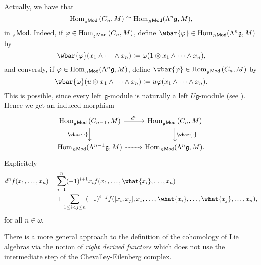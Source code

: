 \begin{remark}
	Actually, we have that 
	\begin{equation*}
		\Hom_{_{\mathfrak{g}}\mathsf{Mod}}\del[0]{C_n,M} \cong \Hom_{_{R}\mathsf{Mod}}(\Lambda^n \mathfrak{g},M),
	\end{equation*}
	\noindent in $_{\mathbb{Z}}\mathsf{Mod}$. Indeed, if $\varphi \in \Hom_{_{\mathfrak{g}}\mathsf{Mod}}\del[0]{C_n,M}$, define $\wbar{\varphi} \in \Hom_{_{R}\mathsf{Mod}}(\Lambda^n \mathfrak{g},M)$ by 
	\begin{equation*}
		\wbar{\varphi}(x_1 \wedge \dots \wedge x_n) := \varphi(1 \otimes x_1 \wedge \dots \wedge x_n),
	\end{equation*}
	\noindent and conversly, if $\varphi \in \operatorname{Hom}_{_{R}\mathsf{Mod}}(\Lambda^n \mathfrak{g},M)$, define $\wbar{\varphi} \in \Hom_{_{\mathfrak{g}}\mathsf{Mod}}\del[0]{C_n,M}$ by
	\begin{equation*}
		\wbar{\varphi}(u \otimes x_1 \wedge \dots \wedge x_n) := u \varphi(x_1 \wedge \dots \wedge x_n).
	\end{equation*}
	\noindent This is possible, since every left $\mathfrak{g}$-module is naturally a left $U\mathfrak{g}$-module (see \cite[224--225]{weibel:homological_algebra:1994}). Hence we get an induced morphism 
	\begin{equation*}
		\begin{tikzcd}
			\Hom_{_{\mathfrak{g}}\mathsf{Mod}}\del[0]{C_{n - 1},M} \arrow[r,"d^n"]\arrow[d,"\wbar{\cdot}"'] & \Hom_{_{\mathfrak{g}}\mathsf{Mod}}\del[0]{C_n,M}\arrow[d,"\wbar{\cdot}"]\\
			\Hom_{_R\mathsf{Mod}}(\Lambda^{n - 1}\mathfrak{g},M) \arrow[r,dashed] & \Hom_{_R\mathsf{Mod}}(\Lambda^n\mathfrak{g},M).
		\end{tikzcd}
	\end{equation*}
	Explicitely
	\begin{align*}
		d^nf(x_1,\dots,x_n) =& \sum_{i = 1}^n(-1)^{i + 1}x_i f(x_1,\dots,\what{x_i},\dots,x_n)\\
		&+ \sum_{1 \leq i < j \leq n}(-1)^{i + j} f([x_i,x_j],x_1,\dots,\what{x_i},\dots,\what{x_j},\dots,x_n),
	\end{align*}
	\noindent for all $n \in \omega$.
\end{remark}

\begin{remark}
	There is a more general approach to the definition of the cohomology of Lie algebras via the notion of \emph{right derived functors} which does not use the intermediate step of the Chevalley-Eilenberg complex. 
\end{remark}

